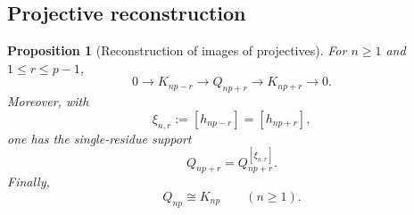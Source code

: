 \documentclass[12pt,leqno]{amsart}
\numberwithin{equation}{section}
\newtheorem{prop}[thm]{Proposition}
\begin{document}
\subsection{Projective reconstruction}

\begin{prop}[Reconstruction of images of projectives]\label{prop:projective-images}
For $n\geq1$ and $1\leq r\leq p-1$,
\begin{equation}\label{eq:F-projective-filtration}
 0\longrightarrow K_{np-r}\longrightarrow Q_{np+r}
 \longrightarrow K_{np+r}\longrightarrow0.
\end{equation}
Moreover, with
\[
 \xi_{n,r}:=[h_{np-r}]=[h_{np+r}],
\]
one has the single-residue support
\begin{equation}\label{eq:F-projective-residue}
 Q_{np+r}=Q_{np+r}^{[\xi_{n,r}]}.
\end{equation}
Finally,
\begin{equation}\label{eq:F-wall-projective}
 Q_{np}\cong K_{np}\qquad(n\geq1).
\end{equation}
\end{prop}
\end{document}

